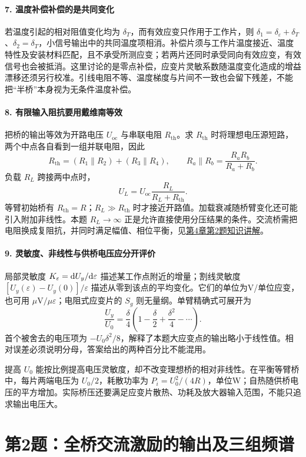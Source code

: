 \paragraph{7. 温度补偿补偿的是共同变化}
若温度引起的相对阻值变化均为 $\delta_T$，而有效应变只作用于工作片，则 $\delta_1=\delta_\varepsilon+\delta_T$、$\delta_2=\delta_T$，小信号输出中的共同温度项相消。补偿片须与工作片温度接近、温度特性及安装材料匹配，且不承受所测应变；若两片还同时承受同向有效应变，有效信号也会被抵消。这里讨论的是零点补偿，应变片灵敏系数随温度变化造成的增益漂移还须另行校准。引线电阻不等、温度梯度与片间不一致也会留下残差，不能把“半桥”本身视为无条件温度补偿。

\paragraph{8. 有限输入阻抗要用戴维南等效}
把桥的输出等效为开路电压 $U_{\mathrm{oc}}$ 与串联电阻 $R_{\mathrm{th}}$。求 $R_{\mathrm{th}}$ 时将理想电压源短路，两个中点各自看到一组并联电阻，因此
\[
R_{\mathrm{th}}=(R_1\parallel R_2)+(R_3\parallel R_4),
\qquad R_a\parallel R_b=\frac{R_aR_b}{R_a+R_b}.
\]
负载 $R_L$ 跨接两中点时，
\[
\boxed{U_L=U_{\mathrm{oc}}\frac{R_L}{R_L+R_{\mathrm{th}}}}.
\]
等臂初始桥有 $R_{\mathrm{th}}=R$；$R_L\gg R_{\mathrm{th}}$ 时才接近开路值。加载衰减随桥臂变化还可能引入附加非线性。本题 $R_L\to\infty$ 正是允许直接使用分压结果的条件。交流桥需把电阻换成复阻抗，并同时满足幅值、相位平衡，见\hyperref[kn:4-2]{第4章第2题知识讲解}。

\paragraph{9. 灵敏度、非线性与供桥电压应分开评价}
局部灵敏度 $K_\varepsilon=\mathrm{d} U_y/\mathrm{d}\varepsilon$ 描述某工作点附近的增量；割线灵敏度 $[U_y(\varepsilon)-U_y(0)]/\varepsilon$ 描述从零到该点的平均变化。它们的单位为V/单位应变，也可用 $\mu\mathrm V/\mu\varepsilon$；电阻式应变片的 $S_g$ 则无量纲。单臂精确式可展开为
\[
\frac{U_y}{U_0}
=\frac{\delta}{4}\left(1-\frac{\delta}{2}
+\frac{\delta^2}{4}-\cdots\right).
\]
首个被舍去的电压项为 $-U_0\delta^2/8$，解释了本题大应变点的输出略小于线性值。相对误差必须说明分母，答案给出的两种百分比不能混用。

提高 $U_0$ 能按比例提高电压灵敏度，却不改变理想桥的相对非线性。在平衡等臂桥中，每片两端电压为 $U_0/2$，耗散功率为 $P_i=U_0^2/(4R)$，单位W；自热随供桥电压的平方增加。实际桥压还要满足应变片散热、功耗及放大器输入范围，不能只追求输出电压大。

\section{第2题：全桥交流激励的输出及三组频谱}
\label{hw:5-2}

